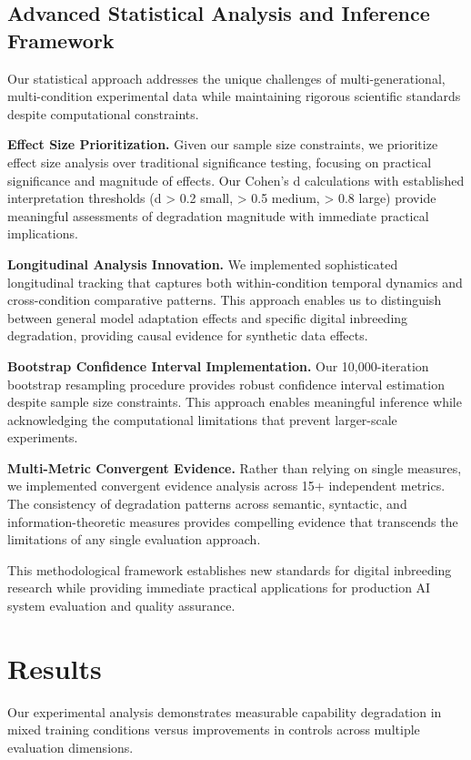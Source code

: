 \documentclass{article}
\begin{document}
\subsection{Advanced Statistical Analysis and Inference Framework}

Our statistical approach addresses the unique challenges of multi-generational, multi-condition experimental data while maintaining rigorous scientific standards despite computational constraints.

\textbf{Effect Size Prioritization.} Given our sample size constraints, we prioritize effect size analysis over traditional significance testing, focusing on practical significance and magnitude of effects. Our Cohen's d calculations with established interpretation thresholds (d > 0.2 small, > 0.5 medium, > 0.8 large) provide meaningful assessments of degradation magnitude with immediate practical implications.

\textbf{Longitudinal Analysis Innovation.} We implemented sophisticated longitudinal tracking that captures both within-condition temporal dynamics and cross-condition comparative patterns. This approach enables us to distinguish between general model adaptation effects and specific digital inbreeding degradation, providing causal evidence for synthetic data effects.

\textbf{Bootstrap Confidence Interval Implementation.} Our 10,000-iteration bootstrap resampling procedure provides robust confidence interval estimation despite sample size constraints. This approach enables meaningful inference while acknowledging the computational limitations that prevent larger-scale experiments.

\textbf{Multi-Metric Convergent Evidence.} Rather than relying on single measures, we implemented convergent evidence analysis across 15+ independent metrics. The consistency of degradation patterns across semantic, syntactic, and information-theoretic measures provides compelling evidence that transcends the limitations of any single evaluation approach.

This methodological framework establishes new standards for digital inbreeding research while providing immediate practical applications for production AI system evaluation and quality assurance.

\section{Results}

Our experimental analysis demonstrates measurable capability degradation in mixed training conditions versus improvements in controls across multiple evaluation dimensions.
\end{document}

